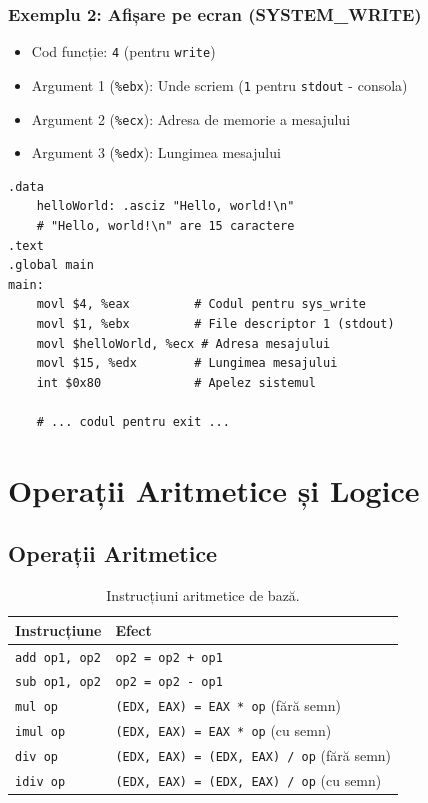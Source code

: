 \documentclass[12pt]{article}
\begin{document}
\subsubsection{Exemplu 2: Afișare pe ecran (SYSTEM\_WRITE)}
\begin{itemize}
    \item Cod funcție: \texttt{4} (pentru \texttt{write})
    \item Argument 1 (\texttt{\%ebx}): Unde scriem (\texttt{1} pentru \texttt{stdout} - consola)
    \item Argument 2 (\texttt{\%ecx}): Adresa de memorie a mesajului
    \item Argument 3 (\texttt{\%edx}): Lungimea mesajului
\end{itemize}
\begin{lstlisting}[language=x86asm]
.data
    helloWorld: .asciz "Hello, world!\n"
    # "Hello, world!\n" are 15 caractere
.text
.global main
main:
    movl $4, %eax         # Codul pentru sys_write
    movl $1, %ebx         # File descriptor 1 (stdout)
    movl $helloWorld, %ecx # Adresa mesajului
    movl $15, %edx        # Lungimea mesajului
    int $0x80             # Apelez sistemul
    
    # ... codul pentru exit ...
\end{lstlisting}

\section{Operații Aritmetice și Logice}

\subsection{Operații Aritmetice}
\begin{table}[h!]
\centering
\begin{tabular}{ll}
\toprule
\textbf{Instrucțiune} & \textbf{Efect} \\
\midrule
\texttt{add op1, op2} & \texttt{op2 = op2 + op1} \\
\texttt{sub op1, op2} & \texttt{op2 = op2 - op1} \\
\texttt{mul op} & \texttt{(EDX, EAX) = EAX * op} (fără semn) \\
\texttt{imul op} & \texttt{(EDX, EAX) = EAX * op} (cu semn) \\
\texttt{div op} & \texttt{(EDX, EAX) = (EDX, EAX) / op} (fără semn) \\
\texttt{idiv op} & \texttt{(EDX, EAX) = (EDX, EAX) / op} (cu semn) \\
\bottomrule
\end{tabular}
\caption{Instrucțiuni aritmetice de bază.}
\end{table}
\end{document}
